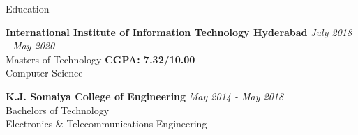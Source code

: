 
\begin{cvsection}{Education}

{\bf \fontsize{12pt}{14pt} \selectfont International Institute of Information Technology Hyderabad} \hfill {\em July 2018 - May 2020} 
\\ Masters of Technology \hfill { {\bf CGPA: 7.32/10.00}}
\\ Computer Science

{\bf \fontsize{12pt}{14pt} \selectfont K.J. Somaiya College of Engineering} \hfill {\em May 2014 - May 2018} 
\\ Bachelors of Technology
\\ Electronics \& Telecommunications Engineering

\end{cvsection}